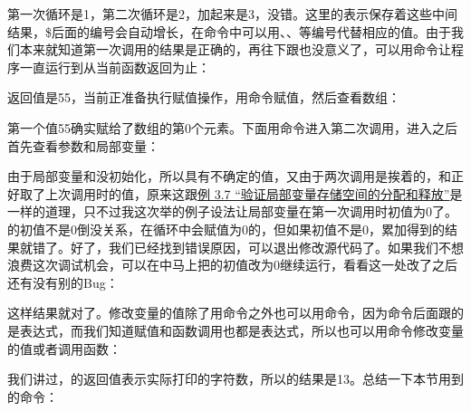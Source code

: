 

第一次循环是1，第二次循环是2，加起来是3，没错。这里的表示保存着这些中间结果，\$后面的编号会自动增长，在命令中可以用、、等编号代替相应的值。由于我们本来就知道第一次调用的结果是正确的，再往下跟也没意义了，可以用命令让程序一直运行到从当前函数返回为止：




返回值是55，当前正准备执行赋值操作，用命令赋值，然后查看数组：




第一个值55确实赋给了数组的第0个元素。下面用命令进入第二次调用，进入之后首先查看参数和局部变量：




由于局部变量和没初始化，所以具有不确定的值，又由于两次调用是挨着的，和正好取了上次调用时的值，原来这跟\hyperlink{db.ch03s04.id2714872}{例 3.\BookSplit{}7 “验证局部变量存储空间的分配和释放”}是一样的道理，只不过我这次举的例子设法让局部变量在第一次调用时初值为0了。的初值不是0倒没关系，在循环中会赋值为0的，但如果初值不是0，累加得到的结果就错了。好了，我们已经找到错误原因，可以退出修改源代码了。如果我们不想浪费这次调试机会，可以在中马上把的初值改为0继续运行，看看这一处改了之后还有没有别的Bug：




这样结果就对了。修改变量的值除了用命令之外也可以用命令，因为命令后面跟的是表达式，而我们知道赋值和函数调用也都是表达式，所以也可以用命令修改变量的值或者调用函数：




我们讲过，的返回值表示实际打印的字符数，所以的结果是13。总结一下本节用到的命令：


